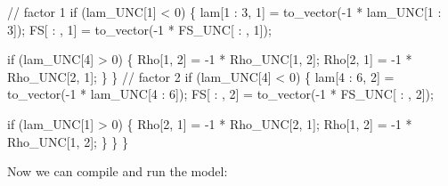 \documentclass[
  letterpaper,
  DIV=11,
  numbers=noendperiod]{scrreprt}
\newenvironment{Shaded}{\begin{snugshade}}{\end{snugshade}}
\newcommand{\CommentTok}[1]{\textcolor[rgb]{0.37,0.37,0.37}{#1}}
\newcommand{\ControlFlowTok}[1]{\textcolor[rgb]{0.00,0.23,0.31}{#1}}
\newcommand{\DecValTok}[1]{\textcolor[rgb]{0.68,0.00,0.00}{#1}}
\newcommand{\NormalTok}[1]{\textcolor[rgb]{0.00,0.23,0.31}{#1}}
\begin{document}
\begin{Shaded}
\begin{Highlighting}[]
  \CommentTok{// factor 1}
  \ControlFlowTok{if}\NormalTok{ (lam\_UNC[}\DecValTok{1}\NormalTok{] \textless{} }\DecValTok{0}\NormalTok{) \{}
\NormalTok{    lam[}\DecValTok{1}\NormalTok{ : }\DecValTok{3}\NormalTok{, }\DecValTok{1}\NormalTok{] = to\_vector({-}}\DecValTok{1}\NormalTok{ * lam\_UNC[}\DecValTok{1}\NormalTok{ : }\DecValTok{3}\NormalTok{]);}
\NormalTok{    FS[ : , }\DecValTok{1}\NormalTok{] = to\_vector({-}}\DecValTok{1}\NormalTok{ * FS\_UNC[ : , }\DecValTok{1}\NormalTok{]);}
    
    \ControlFlowTok{if}\NormalTok{ (lam\_UNC[}\DecValTok{4}\NormalTok{] \textgreater{} }\DecValTok{0}\NormalTok{) \{}
\NormalTok{      Rho[}\DecValTok{1}\NormalTok{, }\DecValTok{2}\NormalTok{] = {-}}\DecValTok{1}\NormalTok{ * Rho\_UNC[}\DecValTok{1}\NormalTok{, }\DecValTok{2}\NormalTok{];}
\NormalTok{      Rho[}\DecValTok{2}\NormalTok{, }\DecValTok{1}\NormalTok{] = {-}}\DecValTok{1}\NormalTok{ * Rho\_UNC[}\DecValTok{2}\NormalTok{, }\DecValTok{1}\NormalTok{];}
\NormalTok{    \}}
\NormalTok{  \}}
  \CommentTok{// factor 2}
  \ControlFlowTok{if}\NormalTok{ (lam\_UNC[}\DecValTok{4}\NormalTok{] \textless{} }\DecValTok{0}\NormalTok{) \{}
\NormalTok{    lam[}\DecValTok{4}\NormalTok{ : }\DecValTok{6}\NormalTok{, }\DecValTok{2}\NormalTok{] = to\_vector({-}}\DecValTok{1}\NormalTok{ * lam\_UNC[}\DecValTok{4}\NormalTok{ : }\DecValTok{6}\NormalTok{]);}
\NormalTok{    FS[ : , }\DecValTok{2}\NormalTok{] = to\_vector({-}}\DecValTok{1}\NormalTok{ * FS\_UNC[ : , }\DecValTok{2}\NormalTok{]);}
    
    \ControlFlowTok{if}\NormalTok{ (lam\_UNC[}\DecValTok{1}\NormalTok{] \textgreater{} }\DecValTok{0}\NormalTok{) \{}
\NormalTok{      Rho[}\DecValTok{2}\NormalTok{, }\DecValTok{1}\NormalTok{] = {-}}\DecValTok{1}\NormalTok{ * Rho\_UNC[}\DecValTok{2}\NormalTok{, }\DecValTok{1}\NormalTok{];}
\NormalTok{      Rho[}\DecValTok{1}\NormalTok{, }\DecValTok{2}\NormalTok{] = {-}}\DecValTok{1}\NormalTok{ * Rho\_UNC[}\DecValTok{1}\NormalTok{, }\DecValTok{2}\NormalTok{];}
\NormalTok{    \}}
\NormalTok{  \}}
\NormalTok{\}}
\end{Highlighting}
\end{Shaded}

Now we can compile and run the model:
\end{document}
